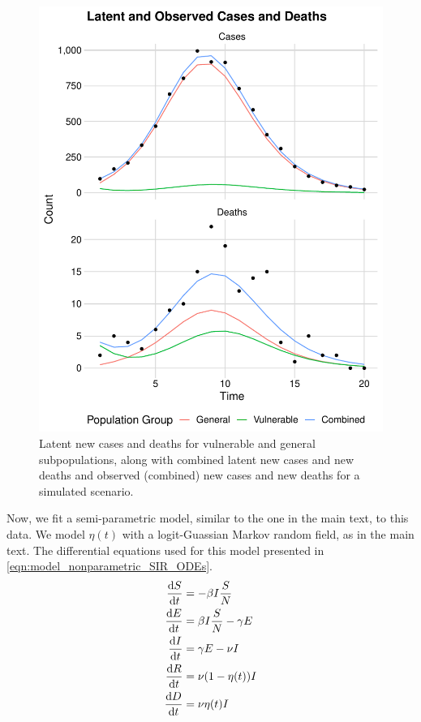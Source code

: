 \begin{figure}[htbp]
    \centering
    \includegraphics[width=0.75\columnwidth]{data_ifr_age_structure_plot}
    \caption{Latent new cases and deaths for vulnerable and general subpopulations, along with combined latent new cases and new deaths and observed (combined) new cases and new deaths for a simulated scenario.}
    \label{ch_4:fig:data_ifr_age_structure_plot}
\end{figure}

Now, we fit a semi-parametric model, similar to the one in the main text, to this data.
We model \( \eta(t) \) with a logit-Guassian Markov random field, as in the main text.
The differential equations used for this model presented in \eqref{eqn:model_nonparametric_SIR_ODEs}.
\begin{equation}
\label{ch_4:eqn:model_nonparametric_SIR_ODEs}
\begin{aligned}
\frac{\mathrm{d} S}{\mathrm{d} t} &= - \beta I \frac{S}{N}\\
\frac{\mathrm{d} E}{\mathrm{d} t} &= \beta I \frac{S}{N} - \gamma E\\
\frac{\mathrm{d} I}{\mathrm{d} t} &= \gamma E - \nu I\\
\frac{\mathrm{d} R}{\mathrm{d} t} &= \nu (1 - \eta(t)) I\\
\frac{\mathrm{d} D}{\mathrm{d} t} &= \nu \eta(t) I\\
\end{aligned}
\end{equation}

